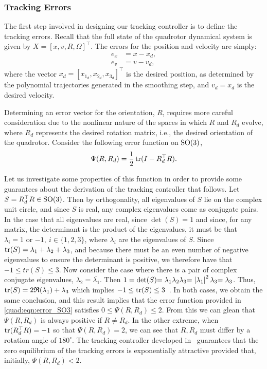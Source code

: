 \subsubsection{Tracking Errors}

The first step involved in designing our tracking controller is to define the tracking errors. Recall that the full state of the quadrotor dynamical system is given by $X = {[x,v,R,\Omega]}^\top$. The errors for the position and velocity are simply:
\begin{align}
    e_x &= x - x_d, \\
    e_v &= v - v_d,
\end{align}
where the vector $x_d = {[x_{1_d}, x_{2_d}, x_{3_d}]}^\top$ is the desired position, as determined by the polynomial trajectories generated in the smoothing step, and $v_d = \dot{x}_d$ is the desired velocity.

Determining an error vector for the orientation, $R$, requires more careful consideration due to the nonlinear nature of the spaces in which $R$ and $R_d$ evolve, where $R_d$ represents the desired rotation matrix, i.e., the desired orientation of the quadrotor. Consider the following error function on $\text{SO}(3)$,
\begin{equation}
    \Psi(R,R_d) = \frac{1}{2}\operatorname{tr}(I - R_d^\top R).
\label{quad:eqn:error_SO3}
\end{equation}

Let us investigate some properties of this function in order to provide some guarantees about the derivation of the tracking controller that follows. Let $S = R_d^\top R \in \text{SO}(3)$. Then by orthogonality, all eigenvalues of $S$ lie on the complex unit circle, and since $S$ is real, any complex eigenvalues come as conjugate pairs. In the case that all eigenvalues are real, since ${\det(S)=1}$ and since, for any matrix, the determinant is the product of the eigenvalues, it must be that $\lambda_i = 1 \text{ or } {-1},\ i \in \{1,2,3\}$, where $\lambda_i$ are the eigenvalues of $S$. Since $\operatorname{tr}(S) = \lambda_1 + \lambda_2 + \lambda_3$, and because there must be an even number of negative eigenvalues to ensure the determinant is positive, we therefore have that $-1 \leq tr(S) \leq 3$. Now consider the case where there is a pair of complex conjugate eigenvalues, $\lambda_2 = \bar{\lambda_1}$. Then $1 = \det(S){=\lambda_1 \lambda_2 \lambda_3} {= \left\lvert\lambda_1\right\rvert^2 \lambda_3 } {= \lambda_3}$. Thus, $\operatorname{tr}(S) = 2\mathfrak{R}(\lambda_1) + \lambda_3$ which implies $-1 \leq \operatorname{tr}(S) \leq 3$~\cite{stackexchangeSO3}. In both cases, we obtain the same conclusion, and this result implies that the error function provided in \autoref{quad:eqn:error_SO3} satisfies $0 \leq \Psi(R,R_d) \leq 2$. From this we can glean that $\Psi(R,R_d)$ is always positive if $R \neq R_d$. In the other extreme, when $\operatorname{tr}(R_d^\top R) = -1$ so that $\Psi(R,R_d) = 2$, we can see that $R, R_d$ must differ by a rotation angle of $180^\circ$. The tracking controller developed in~\cite{Lee2010} guarantees that the zero equilibrium of the tracking errors is exponentially attractive provided that, initially, $\Psi(R,R_d) < 2$.


